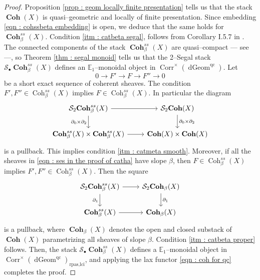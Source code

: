 \documentclass[11pt]{article}
\newcommand{\segal}{\mathcal{S}}
\newcommand{\cohbetass}{\operatorname{Coh}^{ss}_{\beta}(X)}
\newcommand{\cohbetassstack}{\boldsymbol{\operatorname{Coh}}^{ss}_{\beta}(X)}
\newcommand{\cohflat}{\boldsymbol{\operatorname{Coh}}}
\newcommand{\waldhausen}{\mathcal{S}_{\bullet}}
\begin{document}
    \begin{proof}
        Proposition \ref{prop : geom locally finite presentation} tells us that the stack $\cohflat(X)$ is quasi--geometric and locally of finite presentation. Since embedding \eqref{eqn : cohssbeta embedding} is open, we deduce that the same holds for $\cohbetassstack$. Condition  \ref{itm : catbeta segal}, follows from Corollary I.5.7 in \cite{dps}. The connected components of the stack $\cohbetassstack$ are quasi--compact  --- see \cite{Huybrechts_Lehn_2010}  ---, so Theorem \eqref{thm : segal monoid} tells us that the 2--Segal stack $\waldhausen\cohbetassstack$ defines an $\mathbb{E}_1$--monoidal object in $\operatorname{Corr}^\times(\operatorname{dGeom}^{\operatorname{qc}})$. Let 
        \begin{equation}\label{eqn : ses in the proof of catha}
            0 \rightarrow F' \rightarrow F \rightarrow F'' \rightarrow 0
        \end{equation}
        be a short exact sequence of coherent sheaves. The condition $F', F'' \in \cohbetass$ implies $F \in \cohbetass$. In particular the diagram
        \[\begin{tikzcd}
	{\segal_2\cohbetassstack} & {\segal_2\cohflat(X)} \\
	{\cohbetassstack \times \cohbetassstack} & {\cohflat(X) \times \cohflat(X)}
	\arrow[from=1-1, to=1-2]
	\arrow["{\partial_0 \times \partial_2}"', from=1-1, to=2-1]
	\arrow["{\partial_0\times \partial_2}", from=1-2, to=2-2]
	\arrow[from=2-1, to=2-2]
\end{tikzcd}\]
is a pullback. This implies condition \ref{itm : catmeta smooth}. Moreover, if all the sheaves in \eqref{eqn : ses in the proof of catha} have slope $\beta$, then $F\in \cohbetass$ implies $F',F''\in \cohbetass$. Then the square
\[\begin{tikzcd}
	{\segal_2\cohbetassstack} & {\segal_2\cohflat_{\beta}(X)} \\
	\cohbetassstack & \cohflat_{\beta}(X)
	\arrow[from=1-1, to=1-2]
	\arrow["{\partial_1}"', from=1-1, to=2-1]
	\arrow["{\partial_1}", from=1-2, to=2-2]
	\arrow[from=2-1, to=2-2]
\end{tikzcd}\]
is a pullback, where $\cohflat_{\beta}(X)$ denotes the open and closed substack of $\cohflat(X)$ parametrizing all sheaves of slope $\beta$. Condition \ref{itm : catbeta proper} follows. Then, the stack $\waldhausen\cohbetassstack$ defines a $\mathbb{E}_1$--monoidal object in $\operatorname{Corr}^{\times}(\operatorname{dGeom}^{\operatorname{qc}})_{\operatorname{rpas,lci}}$, and applying the lax functor \eqref{eqn : coh for qc} completes the proof.
    \end{proof}
\end{document}
